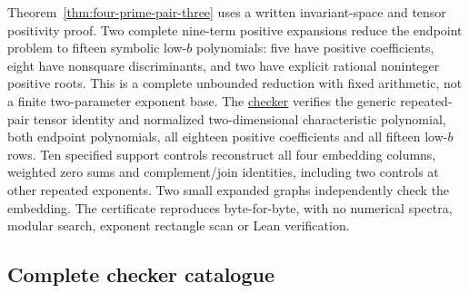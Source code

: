 Theorem~\ref{thm:four-prime-pair-three} uses a written invariant-space
and tensor positivity proof. Two complete nine-term positive expansions
reduce the endpoint problem to fifteen symbolic low-$b$ polynomials:
five have positive coefficients, eight have nonsquare discriminants,
and two have explicit rational noninteger positive roots. This is a
complete unbounded reduction with fixed arithmetic, not a finite
two-parameter exponent base. The
\href{https://github.com/the-omega-institute/ideal-intersection-laplacian/blob/04bf9df41dabe94d9736f930e1df7b92fba6dbb2/scripts/check_four_prime_pair_three.py}{checker}
verifies the generic repeated-pair tensor identity and normalized
two-dimensional characteristic polynomial, both endpoint polynomials,
all eighteen positive coefficients and all fifteen low-$b$ rows.
Ten specified support controls reconstruct all four embedding columns,
weighted zero sums and complement/join identities, including two
controls at other repeated exponents. Two small expanded graphs
independently check the embedding. The certificate reproduces
byte-for-byte, with no numerical spectra, modular search, exponent
rectangle scan or Lean verification.

\ifdefined\DetailedVerification
\subsection{Complete checker catalogue}

\fi

